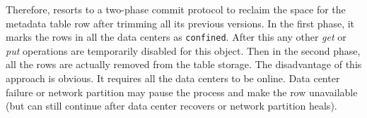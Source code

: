 

Therefore, {\name} resorts to a two-phase commit protocol to reclaim the space
for the metadata table row after trimming all its previous versions. In the
first phase, it marks the rows in all the data centers as \texttt{confined}.
After this any other {\em get} or {\em put} operations are temporarily disabled
for this object. Then in the second phase, all the rows are actually removed
from the table storage. The disadvantage of this approach is obvious. It
requires all the data centers to be online. Data center failure or network
partition may pause the process and make the row unavailable (but can still
continue after data center recovers or network partition heals).  





